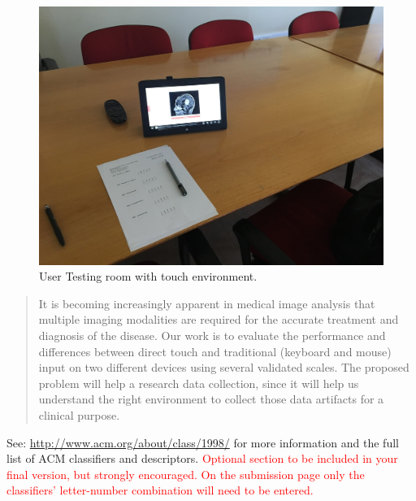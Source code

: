 \documentclass{sigchi}
\begin{document}
\begin{figure}[h]
\centering
\includegraphics[width=1.0\columnwidth]{IMG_4979.JPG}
\caption{User Testing room with touch environment.}
\label{fig:Fig2}
\end{figure}

\begin{abstract}

It is becoming increasingly apparent in medical image analysis that multiple imaging modalities are required for the accurate treatment and diagnosis of the disease. Our work is to  evaluate the performance and differences between direct touch and traditional (keyboard and mouse) input on two different devices using several validated scales. The proposed problem will help a research data collection, since it will help us understand the right environment to collect those data artifacts for a clinical purpose.

\end{abstract}



See: \url{http://www.acm.org/about/class/1998/}
for more information and the full list of ACM classifiers
and descriptors. \newline
\textcolor{red}{Optional section to be included in your final version, 
but strongly encouraged. On the submission page only the classifiers’ 
letter-number combination will need to be entered.}
\end{document}
